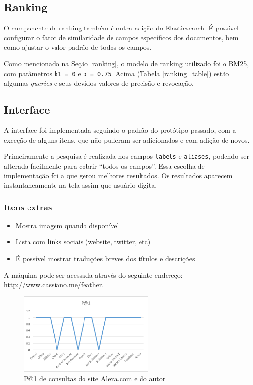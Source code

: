 \documentclass[12pt]{article}
\begin{document}
\subsection{Ranking}

O componente de ranking também é outra adição do Elasticsearch. É possível configurar o fator de similaridade de campos específicos dos documentos, bem como ajustar o valor padrão de todos os campos.

Como mencionado na Seção \ref{ranking}, o modelo de ranking utilizado foi o BM25, com parâmetros \texttt{k1 = 0} e \texttt{b = 0.75}. Acima (Tabela \ref{ranking_table}) estão algumas \emph{queries} e seus devidos valores de precisão e revocação.

\subsection{Interface}

A interface foi implementada seguindo o padrão do protótipo passado, com a exceção de alguns itens, que não puderam ser adicionados e com adição de novos.

Primeiramente a pesquisa é realizada nos campos \texttt{labels} e \texttt{aliases}, podendo ser alterada facilmente para cobrir ``todos os campos''. Essa escolha de implementação foi a que gerou melhores resultados. Os resultados aparecem instantaneamente na tela assim que usuário digita.

\subsubsection{Itens extras}

\begin{itemize}
	\item Mostra imagem quando disponível
	\item Lista com links sociais (website, twitter, etc)
	\item É possível mostrar traduções breves dos títulos e descrições
\end{itemize}

A máquina pode ser acessada através do seguinte endereço:
\hyperref[http://www.cassiano.me/feather]{http://www.cassiano.me/feather}.

\begin{figure}
    \centering
    \includegraphics[width=0.6\textwidth]{img/p1}
    \caption{P@1 de consultas do site Alexa.com e do autor}
    \label{interface}
\end{figure}
\end{document}

